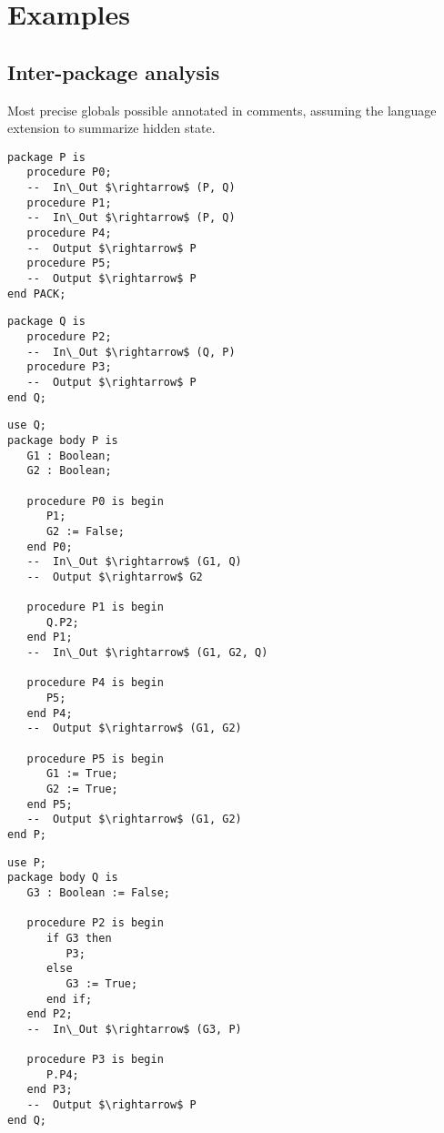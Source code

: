 \documentclass{article}
\begin{document}
\pagebreak
\section{Examples}

\subsection{Inter-package analysis}
Most precise globals possible annotated in comments, assuming the language
extension to summarize hidden state.

\begin{multicols}{2}

\begin{lstlisting}
package P is
   procedure P0;
   --  In\_Out $\rightarrow$ (P, Q)
   procedure P1;
   --  In\_Out $\rightarrow$ (P, Q)
   procedure P4;
   --  Output $\rightarrow$ P
   procedure P5;
   --  Output $\rightarrow$ P
end PACK;
\end{lstlisting}

\vfill\columnbreak

\begin{lstlisting}
package Q is
   procedure P2;
   --  In\_Out $\rightarrow$ (Q, P)
   procedure P3;
   --  Output $\rightarrow$ P
end Q;
\end{lstlisting}

\end{multicols}

\begin{multicols}{2}

\begin{lstlisting}
use Q;
package body P is
   G1 : Boolean;
   G2 : Boolean;

   procedure P0 is begin
      P1;
      G2 := False;
   end P0;
   --  In\_Out $\rightarrow$ (G1, Q)
   --  Output $\rightarrow$ G2

   procedure P1 is begin
      Q.P2;
   end P1;
   --  In\_Out $\rightarrow$ (G1, G2, Q)

   procedure P4 is begin
      P5;
   end P4;
   --  Output $\rightarrow$ (G1, G2)

   procedure P5 is begin
      G1 := True;
      G2 := True;
   end P5;
   --  Output $\rightarrow$ (G1, G2)
end P;
\end{lstlisting}

\vfill\columnbreak

\begin{lstlisting}
use P;
package body Q is
   G3 : Boolean := False;

   procedure P2 is begin
      if G3 then
         P3;
      else
         G3 := True;
      end if;
   end P2;
   --  In\_Out $\rightarrow$ (G3, P)

   procedure P3 is begin
      P.P4;
   end P3;
   --  Output $\rightarrow$ P
end Q;
\end{lstlisting}

\end{multicols}
\end{document}
